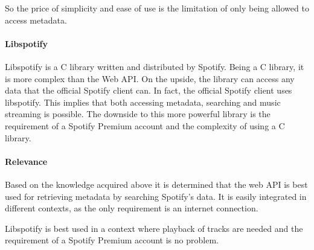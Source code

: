 So the price of simplicity and ease of use is the limitation of only being allowed to access metadata. 

\paragraph{Libspotify}
\label{par:music_catalog_libspotify}

Libspotify is a C library written and distributed by Spotify. Being a C library, it is more complex than the Web API. On the upside, the library can access any data that the official Spotify client can. In fact, the official Spotify client uses libspotify. This implies that both accessing metadata, searching and music streaming is possible. The downside to this more powerful library is the requirement of a Spotify Premium account and the complexity of using a C library.

\paragraph{Relevance}
\label{par:relevance}

Based on the knowledge acquired above it is determined that the web API is best used for retrieving metadata by searching Spotify's data. It is easily integrated in different contexts, as the only requirement is an internet connection.

Libspotify is best used in a context where playback of tracks are needed and the requirement of a Spotify Premium account is no problem.
